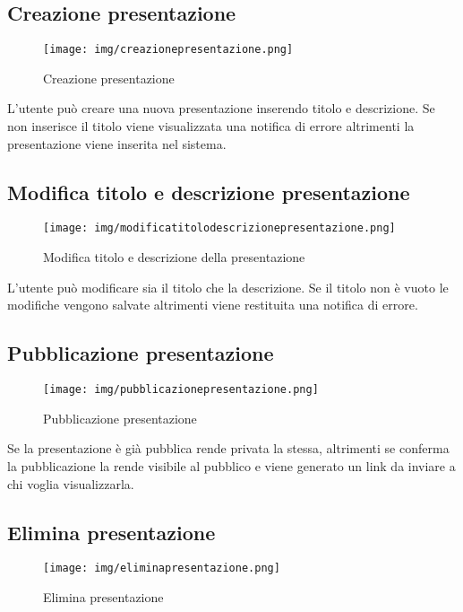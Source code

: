 \subsection{Creazione presentazione}

\begin{figure}[h!]
		\centering
		\texttt{[image: img/creazionepresentazione.png]}
		\caption{Creazione presentazione}
		\label{fig:ModelloSpy}
\end{figure}

L'utente può creare una nuova presentazione inserendo titolo e descrizione. Se non inserisce il titolo viene visualizzata una notifica di errore altrimenti la presentazione viene inserita nel sistema.

\subsection{Modifica titolo e descrizione presentazione}

\begin{figure}[h!]
		\centering
		\texttt{[image: img/modificatitolodescrizionepresentazione.png]}
		\caption{Modifica titolo e descrizione della presentazione}
		\label{fig:ModelloSpy}
\end{figure}

L'utente può modificare sia il titolo che la descrizione. Se il titolo non è vuoto le modifiche vengono salvate altrimenti viene restituita una notifica di errore.

\subsection{Pubblicazione presentazione}

\begin{figure}[h!]
		\centering
		\texttt{[image: img/pubblicazionepresentazione.png]}
		\caption{Pubblicazione presentazione}
		\label{fig:ModelloSpy}
\end{figure}

Se la presentazione è già pubblica rende privata la stessa, altrimenti se conferma la pubblicazione la rende visibile al pubblico e viene generato un link da inviare a chi voglia visualizzarla.

\subsection{Elimina presentazione}

\begin{figure}[h!]
		\centering
		\texttt{[image: img/eliminapresentazione.png]}
		\caption{Elimina presentazione}
		\label{fig:ModelloSpy}
\end{figure}  

